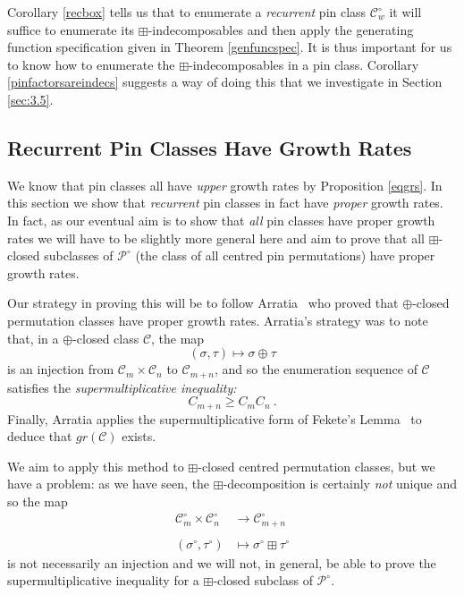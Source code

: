 \documentclass[11pt,a4paper]{article}
\theoremstyle{definition}
\newcommand{\CCC}{\mathcal{C}}
\let\C\CCC
\begin{document}
Corollary \ref{recbox} tells us that to enumerate a \emph{recurrent} pin class $\C_{w}^{\circ}$ it will suffice to enumerate its $\boxplus$-indecomposables and then apply the generating function specification given in Theorem \ref{genfuncspec}. It is thus important for us to know how to enumerate the $\boxplus$-indecomposables in a pin class. Corollary \ref{pinfactorsareindecs} suggests a way of doing this that we investigate in Section \ref{sec:3.5}.

\subsection{Recurrent Pin Classes Have Growth Rates} \label{sec:3.4}

We know that pin classes all have \emph{upper} growth rates by Proposition \ref{eqgrs}. In this section we show that \emph{recurrent} pin classes in fact have \emph{proper} growth rates. In fact, as our eventual aim is to show that \emph{all} pin classes have proper growth rates we will have to be slightly more general here and aim to prove that all $\boxplus$-closed subclasses of $\mathcal{P}^{\circ}$ (the class of all centred pin permutations) have proper growth rates.

Our strategy in proving this will be to follow Arratia~\cite{arratia:on-the-stanley-:} who proved that $\oplus$-closed permutation classes have proper growth rates. Arratia's strategy was to note that, in a $\oplus$-closed class $\mathcal{C}$, the map
\[
\left(\sigma, \tau\right) \mapsto \sigma \oplus \tau
\]
is an injection from $\mathcal{C}_{m} \times \mathcal{C}_{n}$ to $\mathcal{C}_{m+n}$, and so the enumeration sequence of $\mathcal{C}$ satisfies the \emph{supermultiplicative inequality:}
\[
C_{m+n} \geq C_{m}C_{n} \ .
\]
Finally, Arratia applies the supermultiplicative form of Fekete's Lemma~\cite{fekete:uber-die-vertei:} to deduce that $gr(\mathcal{C})$ exists.

We aim to apply this method to $\boxplus$-closed centred permutation classes, but we have a problem: as we have seen, the $\boxplus$-decomposition is certainly \emph{not} unique and so the map
\begin{equation}\label{pairinjection}
\begin{split}
\mathcal{C}^{\circ}_{m} \times \mathcal{C}^{\circ}_{n} & \rightarrow \mathcal{C}^{\circ}_{m+n} \\
 & \\
\left(\sigma^{\circ}, \tau^{\circ}\right) & \mapsto \sigma^{\circ} \boxplus \tau^{\circ}
\end{split}
\end{equation}
is not necessarily an injection and we will not, in general, be able to prove the supermultiplicative inequality for a $\boxplus$-closed subclass of $\mathcal{P}^{\circ}$.
\end{document}
